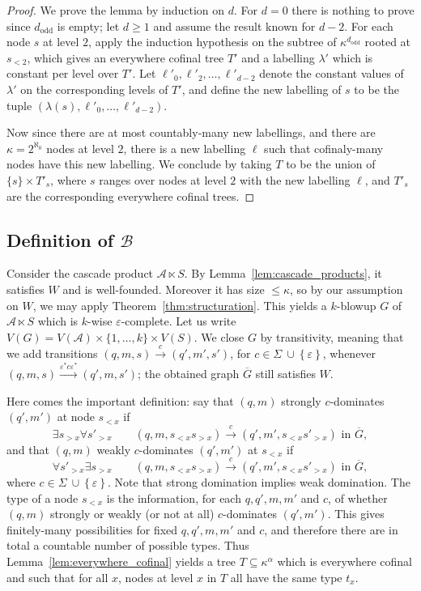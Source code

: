 \documentclass[a4paper,UKenglish,cleveref, thm-restate]{lipics-v2021}
\newcommand{\re}[1]{\xrightarrow{#1}}
\newcommand{\tin}{\text{ in }}
\newcommand{\eps}{\varepsilon}
\newcommand{\odd}{\mathrm{odd}}
\newcommand{\A}{\mathcal{A}}
\newcommand{\casc}{\ltimes}
\newcommand{\Sigmaeps}{\Sigma\ {\cup} \left\{\eps\right\}}
\newcommand{\B}{\mathcal B}
\begin{document}
\begin{proof}
    We prove the lemma by induction on $d$.
    For $d=0$ there is nothing to prove since $d_\odd$ is empty; let $d\geq 1$ and assume the result known for $d-2$.
    For each node $s$ at level $2$, apply the induction hypothesis on the subtree of $\kappa^{d_\odd}$ rooted at $s_{<2}$,
    which gives an everywhere cofinal tree $T'$ and a labelling $\lambda'$ which is constant per level over $T'$.
    Let $\ell'_0,\ell'_2,\dots,\ell'_{d-2}$ denote the constant values of $\lambda'$ on the corresponding levels of $T'$, and define the new labelling of $s$ to be the tuple $(\lambda(s),\ell'_0,\dots,\ell'_{d-2})$.

    Now since there are at most countably-many new labellings, and there are $\kappa=2^{\aleph_0}$ nodes at level $2$, there is a new labelling $\ell$ such that cofinaly-many nodes have this new labelling.
    We conclude by taking $T$ to be the union of $\{s\} \times T'_s$, where $s$ ranges over nodes at level $2$ with the new labelling $\ell$, and $T'_s$ are the corresponding everywhere cofinal trees.
\end{proof}

\subsection{Definition of $\B$}

Consider the cascade product $\A \casc S$. 
By Lemma~\ref{lem:cascade_products}, it satisfies $W$ and is well-founded.
Moreover it has size $\leq \kappa$, so by our assumption on $W$, we may apply Theorem~\ref{thm:structuration}.
This yields a $k$-blowup $G$ of ${\A \casc S}$ which is $k$-wise $\eps$-complete.
Let us write $V(G) = V(\A) \times \{1,\dots,k\} \times V(S)$.
We close $G$ by transitivity, meaning that we add transitions $(q,m,s) \re c (q',m',s')$, for $c \in \Sigmaeps$, whenever $(q,m,s) \re{\eps^* c \eps^*} (q',m,s')$; the obtained graph $\overline{G}$ still satisfies $W$.

Here comes the important definition: say that $(q,m)$ strongly $c$-dominates $(q',m')$ at node $s_{< x}$ if
\[
    \exists s_{> x} \forall s'_{> x} \qquad (q,m,s_{< x} s_{> x}) \re c (q',m',s_{< x} s'_{> x}) \tin \overline{G},
\]
and that $(q,m)$ weakly $c$-dominates $(q',m')$ at $s_{< x}$ if
\[
    \forall s'_{> x} \exists s_{> x} \qquad (q,m,s_{< x} s_{> x}) \re c (q',m',s_{< x} s'_{> x}) \tin \overline{G},
\]
where $c \in \Sigmaeps$.
Note that strong domination implies weak domination.
The type of a node $s_{< x}$ is the information, for each $q,q',m,m'$ and $c$, of whether $(q,m)$ strongly or weakly (or not at all) $c$-dominates $(q',m')$.
This gives finitely-many possibilities for fixed $q,q',m,m'$ and $c$, and therefore there are in total a countable number of possible types.
Thus Lemma~\ref{lem:everywhere_cofinal} yields a tree $T \subseteq \kappa^{\alpha}$ which is everywhere cofinal and such that for all $x$, nodes at level $x$ in $T$ all have the same type $t_x$.
\end{document}
